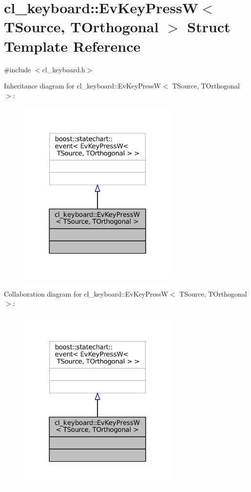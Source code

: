 \hypertarget{structcl__keyboard_1_1EvKeyPressW}{}\section{cl\+\_\+keyboard\+:\+:Ev\+Key\+PressW$<$ T\+Source, T\+Orthogonal $>$ Struct Template Reference}
\label{structcl__keyboard_1_1EvKeyPressW}


{\ttfamily \#include $<$cl\+\_\+keyboard.\+h$>$}



Inheritance diagram for cl\+\_\+keyboard\+:\+:Ev\+Key\+PressW$<$ T\+Source, T\+Orthogonal $>$\+:
\nopagebreak
\begin{figure}[H]
\begin{center}
\leavevmode
\includegraphics[width=228pt]{structcl__keyboard_1_1EvKeyPressW__inherit__graph}
\end{center}
\end{figure}


Collaboration diagram for cl\+\_\+keyboard\+:\+:Ev\+Key\+PressW$<$ T\+Source, T\+Orthogonal $>$\+:
\nopagebreak
\begin{figure}[H]
\begin{center}
\leavevmode
\includegraphics[width=228pt]{structcl__keyboard_1_1EvKeyPressW__coll__graph}
\end{center}
\end{figure}


